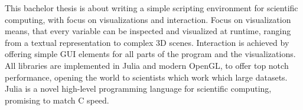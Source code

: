 This bachelor thesis is about writing a simple scripting environment for scientific computing, with focus on visualizations and interaction.
Focus on visualization means, that every variable can be inspected and visualized at runtime, ranging from a textual representation to complex 3D scenes.
Interaction is achieved by offering simple GUI elements for all parts of the program and the visualizations.
All libraries are implemented in Julia and modern OpenGL, to offer top notch performance, opening the world to scientists which work which large datasets.
Julia is a novel high-level programming language for scientific computing, promising to match C speed.